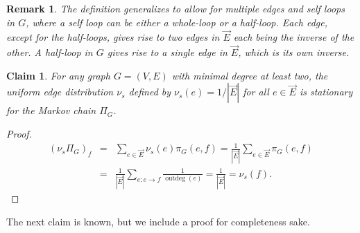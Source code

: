 \documentclass{article}
\newtheorem{claim}[theorem]{Claim}
\newtheorem{remark}[theorem]{Remark}
\newcommand{\dirE}{\vec{E}}
\DeclareMathOperator{\outdeg}{outdeg}
\begin{document}
\begin{remark}
    The definition generalizes to allow for multiple edges and self loops in $G$, where a self loop can be either a whole-loop or a half-loop. 
    Each edge, except for the half-loops, gives rise to two edges in $\dirE$ each being the inverse of the other.  
    A half-loop in $G$ gives rise to a single edge in $\dirE$, which is its own inverse.
\end{remark}

\begin{claim}
    For any graph $G=(V,E)$ with minimal degree at least two, 
    the uniform edge distribution $\nu_s$ defined by $\nu_s(e) = 1/|\dirE|$ for all $e \in \dirE$ is stationary for the Markov chain $\Pi_G$.
\end{claim}
\begin{proof}
    \begin{eqnarray*}
        (\nu_s \Pi_G)_f 
            &=& \sum_{e \in \dirE} \nu_s(e) \pi_G(e,f) = \frac{1}{|\dirE|} \sum_{e \in \dirE} \pi_G(e,f)\\
            &=& \frac{1}{|\dirE|} \sum_{e: e \rightarrow f} \frac{1}{\outdeg(e)} = \frac{1}{|\dirE|} = \nu_s(f).
    \end{eqnarray*}
\end{proof}

\noindent
The next claim is known, but we include a proof for completeness sake.
\end{document}
